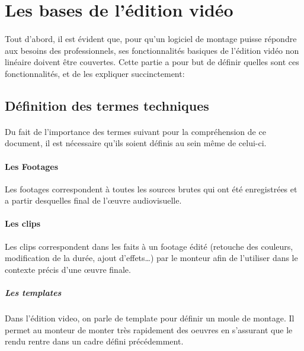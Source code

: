 \newpage

\section{Les bases de l'édition vidéo}

\paragraph{}

Tout d'abord, il est évident que, pour qu'un logiciel de montage
puisse répondre aux besoins des professionnels, ses fonctionnalités
basiques de l'édition vidéo non linéaire doivent être couvertes.
Cette partie a pour but de définir quelles sont ces fonctionnalités,
et de les expliquer succinctement:

\subsection{Définition des termes techniques}

\paragraph {}

Du fait de l'importance des termes suivant pour la compréhension de
ce document, il est nécessaire qu'ils soient définis au sein même
de celui-ci.

\paragraph{Les Footages}

Les footages correspondent à toutes les sources brutes qui ont été
enregistrées et a partir desquelles%
final de l'œuvre audiovisuelle.

\paragraph{Les clips}

Les clips correspondent dans les faits à un footage édité (retouche
des couleurs, modification de la durée, ajout d'effets\ldots) par le
monteur afin de l'utiliser dans le contexte précis d'une œuvre finale.

\subparagraph{Les templates}

Dans l'édition video, on parle de template pour définir un moule de
montage.  Il permet au monteur de monter très rapidement des oeuvres
en s'assurant que le rendu rentre dans un cadre défini précédemment.

